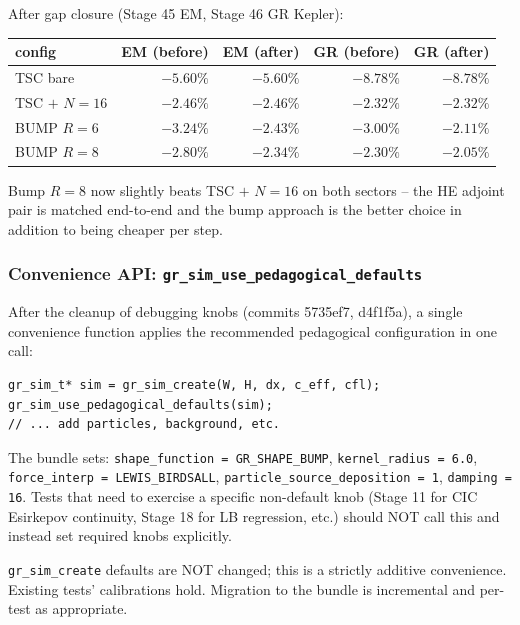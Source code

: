 \documentclass[11pt,a4paper]{article}
\begin{document}
After gap closure (Stage 45 EM, Stage 46 GR Kepler):
\begin{center}
\begin{tabular}{lrrrr}
\toprule
config & EM (before) & EM (after) & GR (before) & GR (after) \\
\midrule
TSC bare       & $-5.60\%$ & $-5.60\%$ & $-8.78\%$ & $-8.78\%$ \\
TSC $+$ $N=16$ & $-2.46\%$ & $-2.46\%$ & $-2.32\%$ & $-2.32\%$ \\
BUMP $R=6$     & $-3.24\%$ & $-2.43\%$ & $-3.00\%$ & $-2.11\%$ \\
BUMP $R=8$     & $-2.80\%$ & $-2.34\%$ & $-2.30\%$ & $-2.05\%$ \\
\bottomrule
\end{tabular}
\end{center}

Bump $R=8$ now slightly beats TSC $+$ $N=16$ on both sectors -- the
HE adjoint pair is matched end-to-end and the bump approach is the
better choice in addition to being cheaper per step.

\subsubsection*{Convenience API: \texttt{gr\_sim\_use\_pedagogical\_defaults}}

After the cleanup of debugging knobs (commits 5735ef7, d4f1f5a), a
single convenience function applies the recommended pedagogical
configuration in one call:

\begin{eqbox}
\begin{verbatim}
gr_sim_t* sim = gr_sim_create(W, H, dx, c_eff, cfl);
gr_sim_use_pedagogical_defaults(sim);
// ... add particles, background, etc.
\end{verbatim}
\end{eqbox}

The bundle sets: \texttt{shape\_function = GR\_SHAPE\_BUMP},
\texttt{kernel\_radius = 6.0}, \texttt{force\_interp = LEWIS\_BIRDSALL},
\texttt{particle\_source\_deposition = 1}, \texttt{damping = 16}.
Tests that need to exercise a specific non-default knob (Stage 11
for CIC Esirkepov continuity, Stage 18 for LB regression, etc.)
should NOT call this and instead set required knobs explicitly.

\texttt{gr\_sim\_create} defaults are NOT changed; this is a
strictly additive convenience.  Existing tests' calibrations hold.
Migration to the bundle is incremental and per-test as appropriate.
\end{document}
